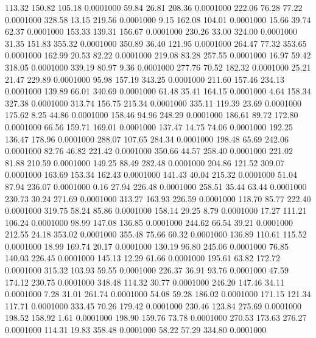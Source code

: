  113.32  150.82  105.18   0.0001000
  59.84   26.81  208.36   0.0001000
 222.06   76.28   77.22   0.0001000
 328.58   13.15  219.56   0.0001000
   9.15  162.08  104.01   0.0001000
  15.66   39.74   62.37   0.0001000
 153.33  139.31  156.67   0.0001000
 230.26   33.00  324.00   0.0001000
  31.35  151.83  355.32   0.0001000
 350.89   36.40  121.95   0.0001000
 264.47   77.32  353.65   0.0001000
 162.99   20.53   82.22   0.0001000
 219.08   83.28  257.55   0.0001000
  16.97   59.42  318.05   0.0001000
 339.19   80.97    9.36   0.0001000
 277.76   70.52  182.32   0.0001000
  25.21   21.47  229.89   0.0001000
  95.98  157.19  343.25   0.0001000
 211.60  157.46  234.13   0.0001000
 139.89   66.01  340.69   0.0001000
  61.48   35.41  164.15   0.0001000
   4.64  158.34  327.38   0.0001000
 313.74  156.75  215.34   0.0001000
 335.11  119.39   23.69   0.0001000
 175.62    8.25   44.86   0.0001000
 158.46   94.96  248.29   0.0001000
 186.61   89.72  172.80   0.0001000
  66.56  159.71  169.01   0.0001000
 137.47   14.75   74.06   0.0001000
 192.25  136.47  178.96   0.0001000
 288.07  107.65  284.34   0.0001000
 198.48   65.69  242.06   0.0001000
  82.76   46.82  221.42   0.0001000
 350.66   44.57  258.40   0.0001000
 221.02   81.88  210.59   0.0001000
 149.25   88.49  282.48   0.0001000
 204.86  121.52  309.07   0.0001000
 163.69  153.34  162.43   0.0001000
 141.43   40.04  215.32   0.0001000
  51.04   87.94  236.07   0.0001000
   0.16   27.94  226.48   0.0001000
 258.51   35.44   63.44   0.0001000
 230.73   30.24  271.69   0.0001000
 313.27  163.93  226.59   0.0001000
 118.70   85.77  222.40   0.0001000
 319.75   58.24   85.86   0.0001000
 158.14   29.25    8.79   0.0001000
  17.27  111.21  106.24   0.0001000
  98.99  147.08  136.85   0.0001000
 244.62   66.54   39.21   0.0001000
 212.55   24.18  353.02   0.0001000
 355.48   75.66   60.32   0.0001000
 136.89  110.61  115.52   0.0001000
  18.99  169.74   20.17   0.0001000
 130.19   96.80  245.06   0.0001000
  76.85  140.03  226.45   0.0001000
 145.13   12.29   61.66   0.0001000
 195.61   63.82  172.72   0.0001000
 315.32  103.93   59.55   0.0001000
 226.37   36.91   93.76   0.0001000
  47.59  174.12  230.75   0.0001000
 348.48  114.32   30.77   0.0001000
 246.20  147.46   34.11   0.0001000
   7.28   31.01  261.74   0.0001000
  54.08   59.28  186.02   0.0001000
 171.15  121.34  117.71   0.0001000
 333.45   70.26  179.42   0.0001000
 230.46  123.84  275.69   0.0001000
 198.52  158.92    1.61   0.0001000
 198.90  159.76   73.78   0.0001000
 270.53  173.63  276.27   0.0001000
 114.31   19.83  358.48   0.0001000
  58.22   57.29  334.80   0.0001000
